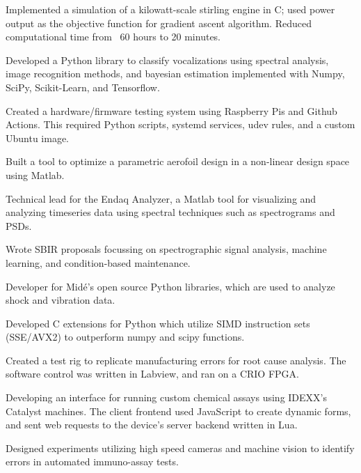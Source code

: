 \documentclass[letterpaper]{deedy-resume} %
\begin{document}
\begin{minipage}[t]{0.66\textwidth}
\sectionspace %
\begin{tightitemize}
\item Implemented a simulation of a kilowatt-scale stirling engine in C; used power output as the objective function for gradient ascent algorithm.  Reduced computational time from ~60 hours to 20 minutes.
\item Developed a Python library to classify vocalizations using spectral analysis, image recognition methods, and bayesian estimation implemented with Numpy, SciPy, Scikit-Learn, and Tensorflow.
\item Created a hardware/firmware testing system using Raspberry Pis and Github Actions.  This required Python scripts, systemd services, udev rules, and a custom Ubuntu image.
\item Built a tool to optimize a parametric aerofoil design in a non-linear design space using Matlab.   
\item Technical lead for the Endaq Analyzer, a Matlab tool for visualizing and analyzing timeseries data using spectral techniques such as spectrograms and PSDs.
\item Wrote SBIR proposals focussing on spectrographic signal analysis, machine learning, and condition-based maintenance.
\item Developer for Midé's open source Python libraries, which are used to analyze shock and vibration data.
\item Developed C extensions for Python which utilize SIMD instruction sets (SSE/AVX2) to outperform numpy and scipy functions.
\end{tightitemize}

\sectionspace %



\begin{tightitemize}
\item Created a test rig to replicate manufacturing errors for root cause analysis.  The software control was written in Labview, and ran on a CRIO FPGA.
\item Developing an interface for running custom chemical assays using IDEXX's Catalyst machines.  The client frontend used JavaScript to create dynamic forms, and sent web requests to the device's server backend written in Lua.
\item Designed experiments utilizing high speed cameras and machine vision to identify errors in automated immuno-assay tests.
\end{tightitemize}


\end{minipage}
\end{document}
